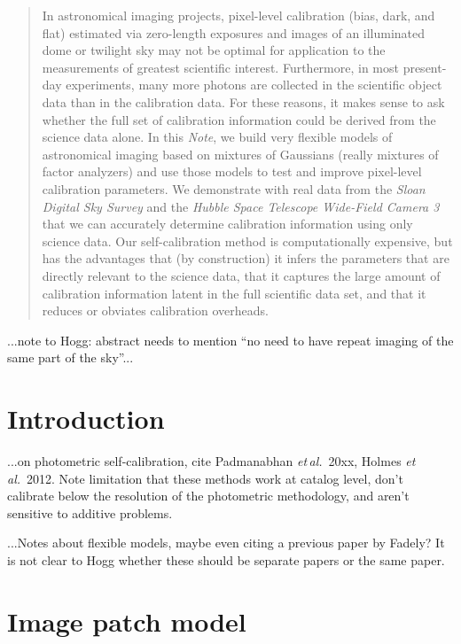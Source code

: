 \documentclass[12pt]{article}
\newcommand{\documentname}{\textsl{Note}}
\newcommand{\foreign}[1]{\textsl{#1}}
\newcommand{\etal}{\foreign{et\,al.}}
\newcommand{\project}[1]{\textsl{#1}}
\begin{document}
\sloppy\sloppypar


\begin{abstract}
In astronomical imaging projects, pixel-level calibration (bias, dark,
and flat) estimated via zero-length exposures and images of an
illuminated dome or twilight sky may not be optimal for application to
the measurements of greatest scientific interest.  Furthermore, in
most present-day experiments, many more photons are collected in the
scientific object data than in the calibration data.  For these
reasons, it makes sense to ask whether the full set of calibration
information could be derived from the science data alone.  In this
\documentname, we build very flexible models of astronomical imaging
based on mixtures of Gaussians (really mixtures of factor analyzers)
and use those models to test and improve pixel-level calibration
parameters.  We demonstrate with real data from the \project{Sloan
  Digital Sky Survey} and the \project{Hubble Space Telescope
  Wide-Field Camera 3} that we can accurately determine calibration
information using only science data.  Our self-calibration method is
computationally expensive, but has the advantages that (by
construction) it infers the parameters that are directly relevant to
the science data, that it captures the large amount of calibration
information latent in the full scientific data set, and that it
reduces or obviates calibration overheads.
\end{abstract}

...note to Hogg: abstract needs to mention ``no need to have repeat
imaging of the same part of the sky''...

\section{Introduction}

...on photometric self-calibration, cite Padmanabhan \etal~20xx, Holmes
\etal~2012.  Note limitation that these methods work at catalog level,
don't calibrate below the resolution of the photometric methodology,
and aren't sensitive to additive problems.

...Notes about flexible models, maybe even citing a previous paper by
Fadely?  It is not clear to Hogg whether these should be separate
papers or the same paper.

\section{Image patch model}
\end{document}
